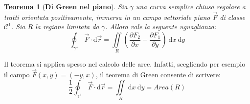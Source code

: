 \documentclass[a4paper]{article}
\newtheorem{theorem}{\textcolor{Red3}{\underline{Teorema}}}
\begin{document}
	\begin{theorem}[\textbf{Di Green nel piano}]\label{theorem: teorema di Green nel piano}
		Sia $\gamma$ una curva semplice chiusa regolare a tratti orientata positivamente, immersa in un campo vettoriale piano $\overset{\rightarrow}{F}$ di classe $\mathcal{C}^{1}$. Sia $R$ la regione limitata da $\gamma$. Allora vale la seguente uguaglianza:
		\begin{equation}
			\displaystyle\oint_{\gamma^{+}} \overset{\rightarrow}{F} \cdot \mathrm{d}\overset{\rightarrow}{r} = \displaystyle\iint\limits_{R} \left(\dfrac{\partial F_{2}}{\partial x} - \dfrac{\partial F_{1}}{\partial y}\right) \:\mathrm{d}x\:\mathrm{d}y
		\end{equation}
	\end{theorem}

	\noindent
	Il teorema si applica spesso nel calcolo delle aree. Infatti, scegliendo per esempio il campo $\overset{\rightarrow}{F}\left(x,y\right) = \left(-y,x\right)$, il teorema di Green consente di scrivere:
	\begin{equation*}
		\dfrac{1}{2}\displaystyle\oint_{\gamma^{+}} \overset{\rightarrow}{F} \cdot \mathrm{d}\overset{\rightarrow}{r} = \displaystyle\iint\limits_{R} \:\mathrm{d}x\:\mathrm{d}y = Area\left(R\right)
	\end{equation*}
\end{document}
